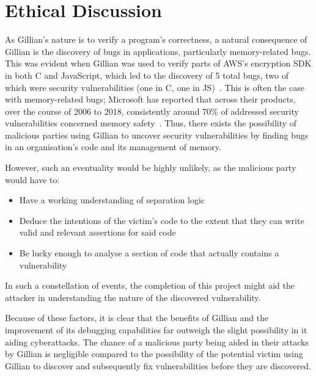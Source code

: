 
\chapter{Ethical Discussion}\label{sec:ethics}

As Gillian's nature is to verify a program's correctness, a natural consequence
of Gillian is the discovery of bugs in applications, particularly memory-related
bugs. This was evident when Gillian was used to verify parts of AWS's encryption
SDK in both C and JavaScript, which led to the discovery of 5 total bugs, two of
which were security vulnerabilities (one in C, one in JS)~\cite{gillian-part2}.
This is often the case with memory-related bugs; Microsoft has reported that
across their products, over the course of 2006 to 2018, consistently around 70\%
of addressed security vulnerabilities concerned memory
safety~\cite{microsoft-memory-bugs}.
Thus, there exists the possibility of malicious parties using Gillian to uncover
security vulnerabilities by finding bugs in an organisation's code and its
management of memory.

However, such an eventuality would be highly unlikely, as the malicious party
would have to:
\begin{itemize}
  \item Have a working understanding of separation logic
  \item Deduce the intentions of the victim's code to the extent that they can
        write valid and relevant assertions for said code
  \item Be lucky enough to analyse a section of code that actually contains a
        vulnerability
\end{itemize}

In such a constellation of events, the completion of this project might aid the
attacker in understanding the nature of the discovered vulnerability.

Because of these factors, it is clear that the benefits of Gillian and the
improvement of its debugging capabilities far outweigh the slight possibility in
it aiding cyberattacks. The chance of a malicious party being aided in their
attacks by Gillian is negligible compared to the possibility of the potential
victim using Gillian to discover and subsequently fix vulnerabilities before
they are discovered.
